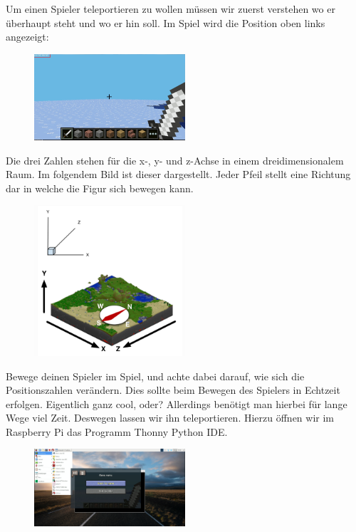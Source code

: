 Um einen Spieler teleportieren zu wollen müssen wir zuerst verstehen wo er überhaupt steht und wo er hin soll. Im Spiel wird die Position oben links angezeigt:

\begin{figure}[H]
	\includegraphics[width=0.5\textwidth]{Bilder/Mincraft_position.png} %
\end{figure}

Die drei Zahlen stehen für die x-, y- und z-Achse in einem dreidimensionalem Raum. Im folgendem Bild ist dieser dargestellt. Jeder Pfeil stellt eine Richtung dar in welche die Figur sich bewegen kann.
\begin{figure}[H]
	\includegraphics[width=0.5\textwidth]{Bilder/dreidimensionalem_Raum.png} %
\end{figure}

Bewege deinen Spieler im Spiel, und achte dabei darauf, wie sich die Positionszahlen verändern. Dies sollte beim Bewegen des Spielers in Echtzeit 
erfolgen. Eigentlich ganz cool, oder? Allerdings benötigt man hierbei für 
lange Wege viel Zeit. Deswegen lassen wir ihn teleportieren. Hierzu öffnen wir im Raspberry Pi das Programm Thonny Python IDE.
\begin{figure}[H]
	\includegraphics[width=0.5\textwidth]{Bilder/Thonny_Python_IDE.png} %
\end{figure}

